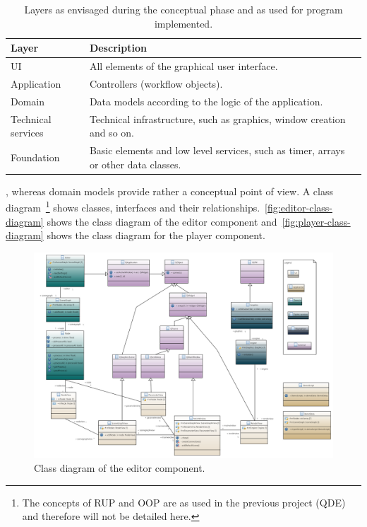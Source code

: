\documentclass[%
    a4paper,    %
    justified,  %
    nobib,      %
    openany     %
]{tufte-book}
\begin{document}
\begin{table}[h]
  \caption{Layers as envisaged during the conceptual phase and as used for
    program implemented.}
  \label{table:layers}
  \begin{tabularx}{\textwidth}{lX}
    \toprule
    \textbf{Layer} & \textbf{Description}\\
    \midrule
    UI                 & All elements of the graphical user interface.                                       \\
    Application        & Controllers (workflow objects).                                                     \\
    Domain             & Data models according to the logic of the application.                              \\
    Technical services & Technical infrastructure, such as graphics, window creation and so on.              \\
    Foundation         & Basic elements and low level services, such as timer, arrays or other data classes. \\
    \bottomrule
  \end{tabularx}
\end{table}

,
whereas domain models provide rather a conceptual point of view. A class
diagram~\footnote{The concepts of RUP and OOP are as used in the previous
project (QDE) and therefore will not be detailed here.} shows classes,
interfaces and their relationships.~\autoref{fig:editor-class-diagram} shows the
class diagram of the editor component and~\autoref{fig:player-class-diagram}
shows the class diagram for the player component.

\begin{figure}[ht]
  \caption{Class diagram of the editor component.}
  \label{fig:editor-class-diagram}
  \includegraphics[width=0.95\linewidth]{images/editor-class-diagram}
\end{figure}
\end{document}
